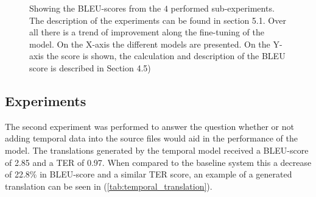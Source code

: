 \mydata

\begin{figure}[h!]
\caption{Showing the BLEU-scores from the $4$ performed sub-experiments. The description of the experiments can be found in section 5.1. Over all there is a trend of improvement along the fine-tuning of the model.  On the X-axis the different models are presented. On the Y-axis the score is shown, the calculation and description of the BLEU score is described in Section 4.5)}

\label{fig:hyperparameter}
\end{figure}

\subsection{Experiments}

The second experiment was performed to answer the question whether or not adding temporal data into the source files would aid in the performance of the model. The translations generated by the temporal model received a BLEU-score of 2.85 and a TER of 0.97. When compared to the baseline system this a decrease of 22.8\% in BLEU-score and a similar TER score, an example of a generated translation can be seen in (\autoref{tab:temporal_translation}). 


